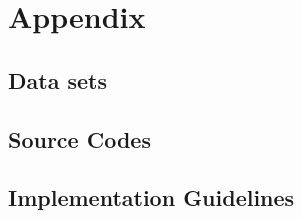 \documentclass{article}
\begin{document}










\pagebreak

\section{Appendix}

	\subsection{Data sets}
	\lipsum[1]

	\subsection{Source Codes}
	\lipsum[1]

	\subsection{Implementation Guidelines}
	\lipsum[1]
\end{document}
